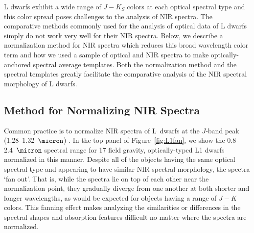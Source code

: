 \documentclass[12pt,preprint]{aastex}
\begin{document}
L dwarfs exhibit a wide range of $J-K_S$ colors at each optical spectral type \cite[e.g.,]{Schmidt10, Faherty:2012cy} and this color spread poses challenges to the analysis of NIR spectra. The comparative methods commonly used for the analysis of optical data of L dwarfs simply do not work very well for their NIR spectra.
Below, we describe a normalization method for NIR spectra which reduces this broad wavelength color term and how we used a sample of optical and NIR spectra to make optically-anchored spectral average templates. 
Both the normalization method and the spectral templates greatly facilitate the comparative analysis of the NIR spectral morphology of L dwarfs.

\subsection{Method for Normalizing NIR Spectra}
\label{sec:method}

Common practice is to normalize NIR spectra of L~dwarfs at the $J$-band peak (1.28--1.32~$\micron$) \citep[e.g.,][]{Kirkpatrick10}. 
In the top panel of Figure~\ref{fig:L1fan}, we show the 0.8--2.4~$\micron$ spectral range for 17 field gravity, optically-typed L1 dwarfs normalized in this manner.
Despite all of the objects having the same optical spectral type and appearing to have similar NIR spectral morphology, the spectra `fan out'. 
That is, while the spectra lie on top of each other near the normalization point, they gradually diverge from one another at both shorter and longer wavelengths, as would be expected for objects having a range of $J-K$ colors. 
This fanning effect makes analyzing the similarities or differences in the spectral shapes and absorption features difficult no matter where the spectra are normalized.

\end{document}
